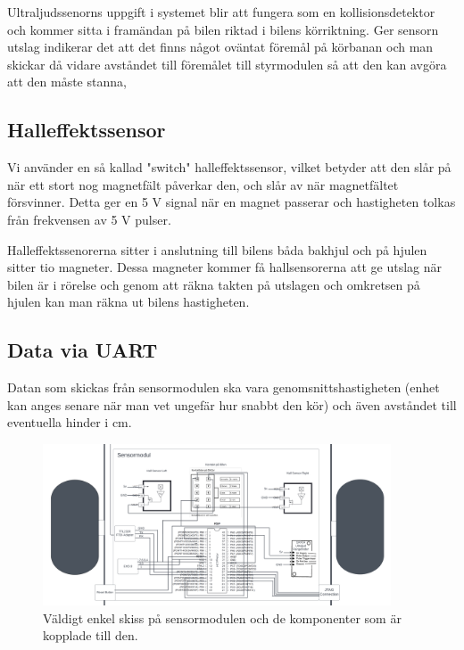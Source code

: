 \documentclass[10pt,oneside,swedish]{lips}
\begin{document}
Ultraljudssenorns uppgift i systemet blir att fungera som en kollisionsdetektor och kommer sitta i framändan på bilen riktad i bilens körriktning. 
Ger sensorn utslag indikerar det att det finns något oväntat föremål på körbanan och man skickar då vidare avståndet till föremålet till styrmodulen så att den kan avgöra att den måste stanna,

\subsection{Halleffektssensor}
Vi använder en så kallad "switch" halleffektssensor, vilket betyder att den slår på när ett stort nog magnetfält påverkar den, och slår av när magnetfältet försvinner. Detta ger en 5 V signal när en magnet passerar och hastigheten tolkas från frekvensen av 5 V pulser.

Halleffektssenorerna sitter i anslutning till bilens båda bakhjul och på hjulen sitter tio magneter. Dessa magneter kommer få hallsensorerna att ge utslag när bilen är i rörelse och genom att räkna takten på utslagen och omkretsen på hjulen kan man räkna ut bilens hastigheten. 

\subsection{Data via UART}
Datan som skickas från sensormodulen ska vara genomsnittshastigheten (enhet kan anges senare när man vet ungefär hur snabbt den kör) och även avståndet till eventuella hinder i cm.


\begin{figure}[htbp]
  \centering
  \includegraphics[width=0.92\textwidth]{./Figures/detalj_sensormodul.png}
  \caption{Väldigt enkel skiss på sensormodulen och de komponenter som är kopplade till den.}
  \label{fig:detalj_sensormodul.png}
\end{figure}

\clearpage
\end{document}
